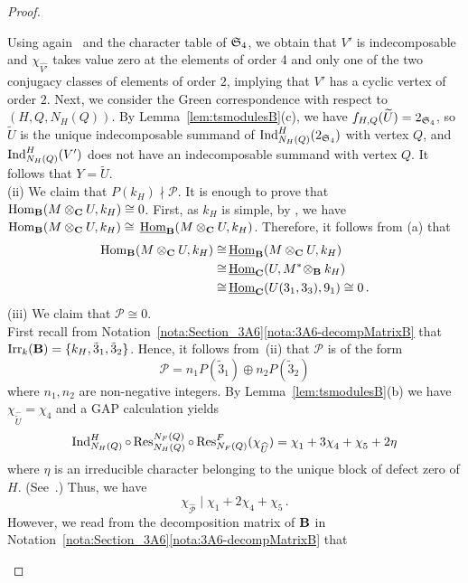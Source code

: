 \begin{proof}
\begin{enumerate}[label={\rm(\alph*)}]
    Using again~\cite[II, Lemma 12.6(ii)]{LandrockBook} and  the character table of ${\mathfrak{S}}_4$, we obtain that $V'$ is indecomposable and $\chi^{}_{\widehat{V'}}$ takes value zero at the elements of order 4 and only one of the two conjugacy classes of elements of order $2$, implying that $V'$ has a cyclic vertex of order $2$.
    Next, we consider the Green correspondence with respect to $(H,Q,N_H(Q))$. By Lemma~\ref{lem:tsmodulesB}(c), we have $f_{H,Q}(\widetilde{U})=2_{{\mathfrak{S}}_4}$, so $\widetilde{U}$ is the unique indecomposable summand of $\operatorname{Ind}_{N_H(Q)}^H(2_{{\mathfrak{S}}_4})$ with vertex $Q$, and $\operatorname{Ind}_{N_H(Q)}^H(V')$ does not have an indecomposable summand with vertex $Q$. It follows that \medskip $Y=\widetilde{U}$. \\
    (ii) We claim that $P(k_H)\nmid\mathcal{P}$.
    It is enough to prove that $\operatorname{Hom}_{{\mathbf{B}}}(M\otimes_{{\mathbf{C}}}U, k_H)\cong 0$.
    First, as $k_H$ is simple, by \cite[Corollary 4.13.4]{LinckelmannVol1}, we have  
    $\operatorname{Hom}_{{\mathbf{B}}}(M\otimes_{{\mathbf{C}}}U, k_H)\cong\,  \underline{\operatorname{Hom}}_{{\mathbf{B}}}(M\otimes_{{\mathbf{C}}}U, k_H)$. Therefore, it follows from (a) that 
     \begin{align*}
     \operatorname{Hom}_{{\mathbf{B}}}(M\otimes_{{\mathbf{C}}}U, k_H)
     \cong&\, \underline{\operatorname{Hom}}_{{\mathbf{B}}}(M\otimes_{{\mathbf{C}}}U, k_H)\\
      \cong&\,  \underline{\operatorname{Hom}}_{{\mathbf{C}}}(U, M^\ast\!\otimes_{{\mathbf{B}}}k_H)\\
      \cong&\,  \underline{\operatorname{Hom}}_{{\mathbf{C}}}(U(3_1,3_3), 9_1)\cong 0\,.
     \end{align*}
    (iii) We claim that $\mathcal{P}\cong 0$.\\
    First recall from Notation~\ref{nota:Section_3A6}\ref{nota:3A6-decompMatrixB} that $\operatorname{Irr}_k({\mathbf{B}})=\{k_H, \tilde{3}_1,\tilde{3}_2\}$. Hence, it follows from~(ii) that $\mathcal{P}$ is of the form 
    \[
        \mathcal{P}=n_1 P(\tilde{3}_1)\oplus n_2P(\tilde{3}_2)
    \]
   where $n_1,n_2$ are non-negative integers. 
    By Lemma~\ref{lem:tsmodulesB}(b) we have $\chi^{}_{\widehat{\widetilde{U}}}=\chi^{}_4$ and a GAP calculation \cite{GAP} yields
    \[
        \operatorname{Ind}_{N_H(Q)}^H\circ\operatorname{Res}^{N_F(Q)}_{N_H(Q)}\circ\operatorname{Res}^F_{N_F(Q)}(\chi^{}_{\widehat{U}})=\chi^{}_1+3\chi^{}_{4}+\chi^{}_{5}+2\eta
    \]
    where $\eta$ is an irreducible character belonging to the unique block of defect zero of $H$. (See~\cite[L3(2)mod2]{ModularAtlas}.) Thus, we have
    \[
    \chi^{}_{\widehat{\mathcal{P}}}\mid \chi^{}_{1}+2\chi^{}_{4}+\chi^{}_5\,.
    \]
    However, we read from the decomposition matrix of ${\mathbf{B}}$ in Notation~\ref{nota:Section_3A6}\ref{nota:3A6-decompMatrixB} that 

\end{enumerate}
\end{proof}
